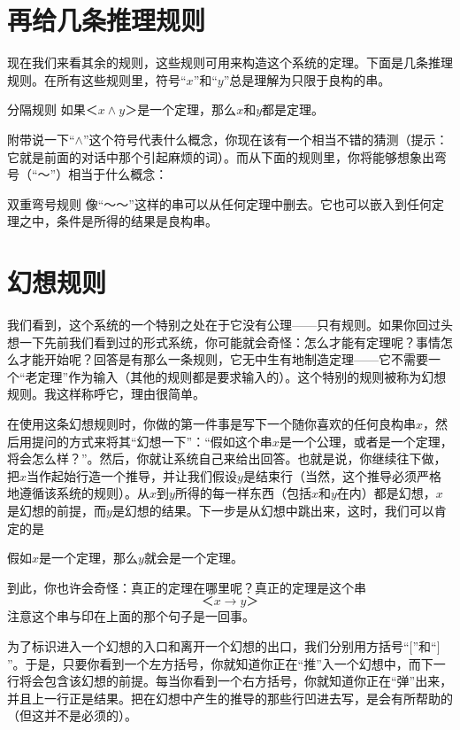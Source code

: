 \section{再给几条推理规则}

现在我们来看其余的规则，这些规则可用来构造这个系统的定理。下面是几条推理规则。在所有这些规则里，符号“$x$”和“$y$”总是理解为只限于良构的串。

\begin{thm}{分隔规则}
如果$＜x∧y＞$是一个定理，那么$x$和$y$都是定理。
\end{thm}
附带说一下“$∧$”这个符号代表什么概念，你现在该有一个相当不错的猜测（提示：它就是前面的对话中那个引起麻烦的词）。而从下面的规则里，你将能够想象出弯号（“$～$”）相当于什么概念：

\begin{thm}{双重弯号规则}
像“$～～$”这样的串可以从任何定理中删去。它也可以嵌入到任何定理之中，条件是所得的结果是良构串。
\end{thm}

\section{幻想规则}

我们看到，这个系统的一个特别之处在于它没有公理——只有规则。如果你回过头想一下先前我们看到过的形式系统，你可能就会奇怪：怎么才能有定理呢？事情怎么才能开始呢？回答是有那么一条规则，它无中生有地制造定理——它不需要一个“老定理”作为输入（其他的规则都是要求输入的）。这个特别的规则被称为幻想规则。我这样称呼它，理由很简单。

在使用这条幻想规则时，你做的第一件事是写下一个随你喜欢的任何良构串$x$，然后用提问的方式来将其“幻想一下”：“假如这个串$x$是一个公理，或者是一个定理，将会怎么样？”。然后，你就让系统自己来给出回答。也就是说，你继续往下做，把$x$当作起始行造一个推导，并让我们假设$y$是结束行（当然，这个推导必须严格地遵循该系统的规则）。从$x$到$y$所得的每一样东西（包括$x$和$y$在内）都是幻想，$x$是幻想的前提，而$y$是幻想的结果。下一步是从幻想中跳出来，这时，我们可以肯定的是

\begin{block}
假如$x$是一个定理，那么$y$就会是一个定理。
\end{block}
到此，你也许会奇怪：真正的定理在哪里呢？真正的定理是这个串
\[
＜x→y＞
\]
注意这个串与印在上面的那个句子是一回事。

为了标识进入一个幻想的入口和离开一个幻想的出口，我们分别用方括号“$[$”和“$]$”。于是，只要你看到一个左方括号，你就知道你正在“推”入一个幻想中，而下一行将会包含该幻想的前提。每当你看到一个右方括号，你就知道你正在“弹”出来，并且上一行正是结果。把在幻想中产生的推导的那些行凹进去写，是会有所帮助的（但这并不是必须的）。

